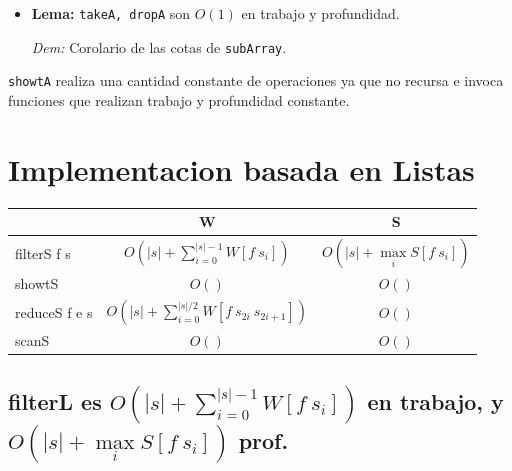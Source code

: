 \documentclass[12pt]{article}
\begin{document}
\begin{itemize}
\item \textbf{Lema:}  \texttt{takeA, dropA} son $O(1)$ en trabajo y profundidad.

 \textit{Dem:} Corolario de las cotas de \texttt{subArray}.

\end{itemize}

\texttt{showtA} realiza una cantidad constante de operaciones ya que no recursa e invoca funciones que realizan trabajo y profundidad constante.

\section{Implementacion basada en Listas}

\begin{tabular}{@{}lcc@{}}
\toprule
        & W & S \\ 
\midrule
filterS f s & $O(|s| + \sum\limits_{i=0}^{|s|-1} W[f\ s_i])$  & $O(|s| + \max\limits_{i} S[f\ s_i] )$  \\
showtS  & $O()$  &  $O()$ \\
reduceS f e s & $O(|s| + \sum\limits_{i=0}^{|s|/2} W[f\ s_{2i}\ s_{2i+1}])$  &  $O()$ \\
scanS   & $O()$  &  $O()$ \\ 
\bottomrule
\end{tabular}


\subsection{filterL es $O(|s| + \sum\limits_{i=0}^{|s|-1} W[f\ s_i])$ en trabajo, y $O(|s| + \max\limits_{i} S[f\ s_i] )$ prof.}
\end{document}
